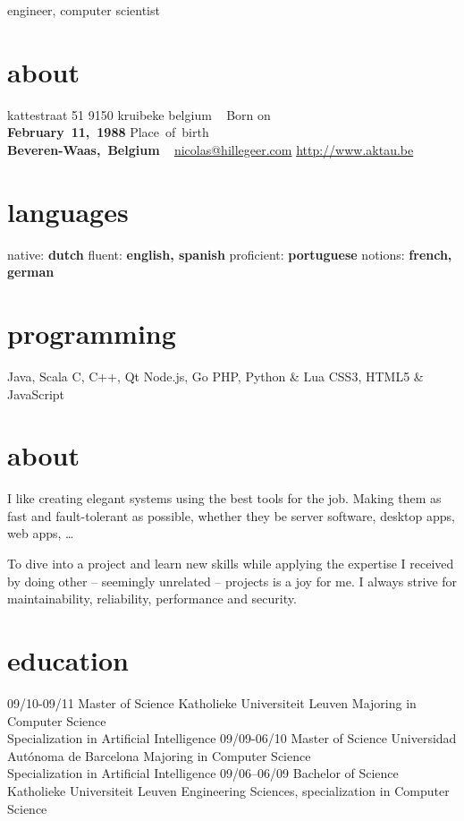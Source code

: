 \documentclass[]{friggeri-cv}
\begin{document}
       {engineer, computer scientist}

\begin{aside}
  \section{about}
    kattestraat 51
    9150 kruibeke
    belgium
    ~
    Born on\\\textbf{February~11,~1988}
    Place~of~birth\\\textbf{Beveren-Waas,~Belgium}
    ~
    \href{mailto:nicolas@hillegeer.com}{nicolas@hillegeer.com}
    \href{http://www.aktau.be}{http://www.aktau.be}
  \section{languages}
    native: \textbf{dutch}
    fluent: \textbf{english, spanish}
    proficient: \textbf{portuguese}
    notions: \textbf{french, german}
  \section{programming}
    Java, Scala
    C, C++, Qt
    Node.js, Go
    PHP, Python \& Lua
    CSS3, HTML5 \& JavaScript
\end{aside}

\section{about}

I like creating elegant systems using the best tools for the job. Making them as fast and fault-tolerant as possible,
whether they be server software, desktop apps, web apps, \ldots

To dive into a project and learn new skills while applying the expertise I received by doing other -- seemingly unrelated -- projects
is a joy for me. I always strive for maintainability, reliability, performance and security.

\section{education}

\begin{entrylist}
  \entry
    {09/10-09/11}
    {Master of Science}
    {Katholieke Universiteit Leuven}
    {Majoring in Computer Science\\
    Specialization in Artificial Intelligence}
  \entry
    {09/09-06/10}
    {Master of Science}
    {Universidad Autónoma de Barcelona}
    {Majoring in Computer Science\\
    Specialization in Artificial Intelligence}
  \entry
    {09/06–06/09}
    {Bachelor of Science}
    {Katholieke Universiteit Leuven}
    {Engineering Sciences, specialization in Computer Science}
\end{entrylist}
\end{document}

